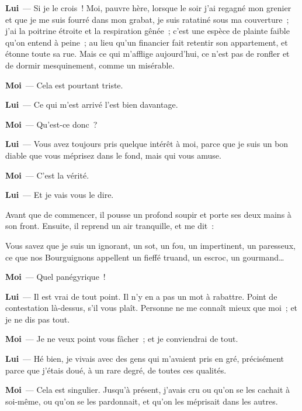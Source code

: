 \documentclass[french,twoside]{book} %
\newcommand{\labelchar}[1]{\textbf{\color{rubric} #1}}
\begin{document}
\labelchar{Lui} — Si je le crois ! Moi, pauvre hère, lorsque le soir j’ai regagné mon grenier et que je me suis fourré dans mon grabat, je suis ratatiné sous ma couverture ; j’ai la poitrine étroite et la respiration gênée ; c’est une espèce de plainte faible qu’on entend à peine ; au lieu qu’un financier fait retentir son appartement, et étonne toute sa rue. Mais ce qui m’afflige aujourd’hui, ce n’est pas de ronfler et de dormir mesquinement, comme un misérable.\par
\labelchar{Moi} — Cela est pourtant triste.\par
\labelchar{Lui} — Ce qui m’est arrivé l’est bien davantage.\par
\labelchar{Moi} — Qu’est-ce donc ?\par
\labelchar{Lui} — Vous avez toujours pris quelque intérêt à moi, parce que je suis un bon diable que vous méprisez dans le fond, mais qui vous amuse.\par
\labelchar{Moi} — C’est la vérité.\par
\labelchar{Lui} — Et je vais vous le dire.\par
Avant que de commencer, il pousse un profond soupir et porte ses deux mains à son front. Ensuite, il reprend un air tranquille, et me dit :\par
Vous savez que je suis un ignorant, un sot, un fou, un impertinent, un paresseux, ce que nos Bourguignons appellent un fieffé truand, un escroc, un gourmand…\par
\labelchar{Moi} — Quel panégyrique !\par
\labelchar{Lui} — Il est vrai de tout point. Il n’y en a pas un mot à rabattre. Point de contestation là-dessus, s’il vous plaît. Personne ne me connaît mieux que moi ; et je ne dis pas tout.\par
\labelchar{Moi} — Je ne veux point vous fâcher ; et je conviendrai de tout.\par
\labelchar{Lui} — Hé bien, je vivais avec des gens qui m’avaient pris en gré, précisément parce que j’étais doué, à un rare degré, de toutes ces qualités.\par
\labelchar{Moi} — Cela est singulier. Jusqu’à présent, j’avais cru ou qu’on se les cachait à soi-même, ou qu’on se les pardonnait, et qu’on les méprisait dans les autres.\par
\end{document}
